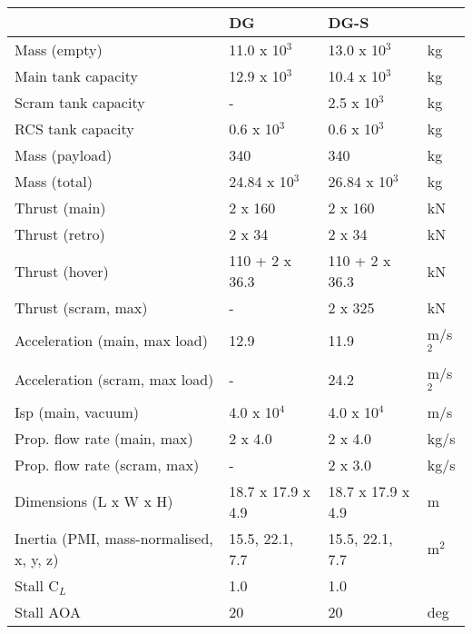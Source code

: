 \documentclass[Orbiter User Manual.tex]{subfiles}
\begin{document}
	\begin{longtable}{ |p{}|p{}|p{}|p{}| }
	\hline\rule{0pt}{2ex}
	& \textbf{DG} & \textbf{DG-S} &\\
	\hline\rule{0pt}{2ex}
	Mass (empty) & 11.0 x 10$^{3}$ & 13.0 x 10$^{3}$ & kg\\
	\hline\rule{0pt}{2ex}
	Main tank capacity & 12.9 x 10$^{3}$ & 10.4 x 10$^{3}$ & kg\\
	\hline\rule{0pt}{2ex}
	Scram tank capacity & - & 2.5 x 10$^{3}$ & kg\\
	\hline\rule{0pt}{2ex}
	RCS tank capacity & 0.6 x 10$^{3}$ & 0.6 x 10$^{3}$ & kg\\
	\hline\rule{0pt}{2ex}
	Mass (payload) & 340 & 340 & kg\\
	\hline\rule{0pt}{2ex}
	Mass (total) & 24.84 x 10$^{3}$ & 26.84 x 10$^{3}$ & kg\\
	\hline\rule{0pt}{2ex}
	Thrust (main) & 2 x 160 & 2 x 160 & kN\\
	\hline\rule{0pt}{2ex}
	Thrust (retro) & 2 x 34 & 2 x 34 & kN\\
	\hline\rule{0pt}{2ex}
	Thrust (hover) & 110 + 2 x 36.3 & 110 + 2 x 36.3 & kN\\
	\hline\rule{0pt}{2ex}
	Thrust (scram, max) & - & 2 x 325 & kN\\
	\hline\rule{0pt}{2ex}
	Acceleration (main, max load) & 12.9 & 11.9 & m/s$^{2}$\\
	\hline\rule{0pt}{2ex}
	Acceleration (scram, max load) & - & 24.2 & m/s$^{2}$\\
	\hline\rule{0pt}{2ex}
	Isp (main, vacuum) & 4.0 x 10$^{4}$ & 4.0 x 10$^{4}$ & m/s\\
	\hline\rule{0pt}{2ex}
	Prop. flow rate (main, max) & 2 x 4.0 & 2 x 4.0 & kg/s\\
	\hline\rule{0pt}{2ex}
	Prop. flow rate (scram, max) & - & 2 x 3.0 & kg/s\\
	\hline\rule{0pt}{2ex}
	Dimensions (L x W x H) & 18.7 x 17.9 x 4.9 & 18.7 x 17.9 x 4.9 & m\\
	\hline\rule{0pt}{2ex}
	Inertia (PMI, mass-normalised, x, y, z) & 15.5, 22.1, 7.7 & 15.5, 22.1, 7.7 & m$^{2}$\\
	\hline\rule{0pt}{2ex}
	Stall C$_{L}$ & 1.0 & 1.0 &\\
	\hline\rule{0pt}{2ex}
	Stall AOA & 20 & 20 & deg\\
	\hline
	\end{longtable}
\end{document}
